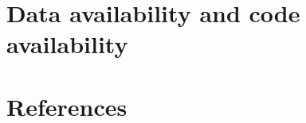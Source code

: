 \documentclass[5p]{elsarticle} %
\begin{document}
\section{Data availability and code availability}

\section{References}

\end{document}
